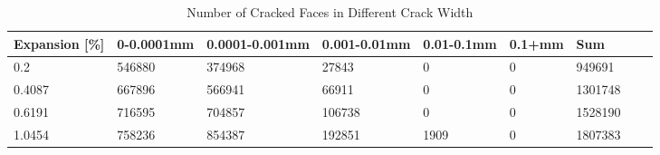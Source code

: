
\begin{table}[ht!]
    \centering
    \begin{tabular}{| p{2.0cm} | p{1.6cm} | p{1.6cm} | p{1.6cm} | p{1.6cm} | p{1.6cm} | p{1.6cm} | p{1.6cm} | p{2.0cm} | }
    \hline

	Expansion [\%] & 0-0.0001mm & 0.0001-0.001mm & 0.001-0.01mm & 0.01-0.1mm & 0.1+mm & Sum \\ \hline

    0.2 &	546880 &	374968 &	27843 &	0 &	0 &	949691\\ \hline
    0.4087 &	667896 &	566941 &	66911 &	0 &	0 &	1301748\\ \hline
    0.6191 &	716595 &	704857 &	106738 &	0 &	0 &	1528190\\ \hline
    1.0454 &	758236 &	854387 &	192851 &	1909 &	0 &	1807383\\ \hline

    \end{tabular}
    \caption{Number of Cracked Faces in Different Crack Width}
    \label{}
\end{table}

